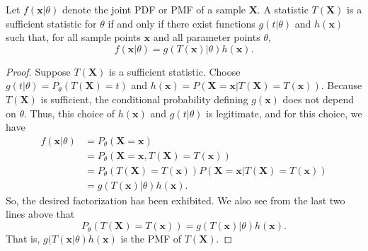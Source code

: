 \begin{theorem}
Let $f(\mathbf{x}|\theta)$ denote the joint PDF or PMF of a sample $\mathbf{X}$.
A statistic $T(\mathbf{X})$ is a sufficient statistic for $\theta$ if and only if there exist functions $g(t|\theta)$ and $h(\mathbf{x})$ such that, for all sample points $\mathbf{x}$ and all parameter points $\theta$,
\begin{equation*}
f(\mathbf{x}|\theta) = g(T(\mathbf{x})|\theta) h(\mathbf{x}) .
\end{equation*}
\end{theorem}
\begin{proof}
Suppose $T(\mathbf{X})$ is a sufficient statistic.
Choose $g(t|\theta) = P_{\theta} (T(\mathbf{X}) = t)$ and $h(\mathbf{x}) = P(\mathbf{X} = \mathbf{x} | T(\mathbf{X}) = T(\mathbf{x}))$.
Because $T(\mathbf{X})$ is sufficient, the conditional probability defining $g(\mathbf{x})$ does not depend on $\theta$.
Thus, this choice of $h(\mathbf{x})$ and $g(t|\theta)$ is legitimate, and for this choice, we have
\begin{equation*}
\begin{split}
f(\mathbf{x}|\theta) &= P_{\theta} (\mathbf{X} = \mathbf{x}) \\
&= P_{\theta} (\mathbf{X} = \mathbf{x}, T(\mathbf{X}) = T(\mathbf{x})) \\
&= P_{\theta} (T(\mathbf{X}) = T(\mathbf{x}))
P (\mathbf{X} = \mathbf{x} | T(\mathbf{X}) = T(\mathbf{x})) \\
&= g(T(\mathbf{x})|\theta) h(\mathbf{x}) .
\end{split}
\end{equation*}
So, the desired factorization has been exhibited.
We also see from the last two lines above that
\begin{equation*}
P_{\theta} (T(\mathbf{X}) = T(\mathbf{x}))
= g(T(\mathbf{x})|\theta) h(\mathbf{x}) .
\end{equation*}
That is, $g(T(\mathbf{x}|\theta) h(\mathbf{x})$ is the PMF of $T(\mathbf{X})$.


\end{proof}
